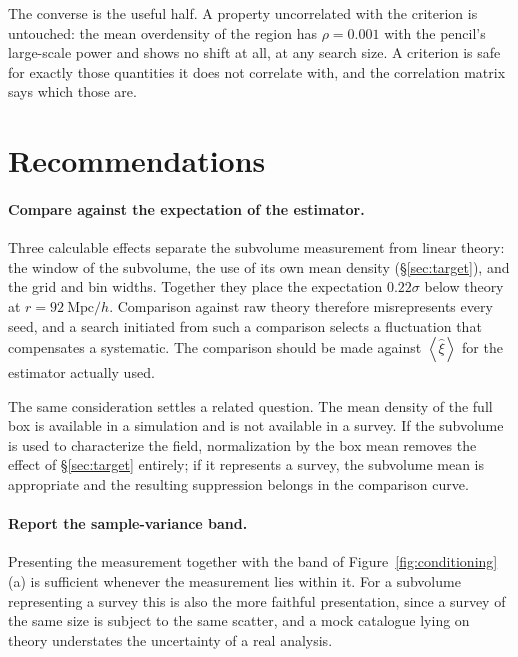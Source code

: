 \documentclass[12pt]{article}
\newcommand{\avg}[1]{\left\langle #1 \right\rangle}
\newcommand{\Mpch}{\ \mathrm{Mpc}/h}
\begin{document}
The converse is the useful half.  A property uncorrelated with the
criterion is untouched: the mean overdensity of the region has
$\rho = 0.001$ with the pencil's large-scale power and shows no shift at
all, at any search size.  A criterion is safe for exactly those
quantities it does not correlate with, and the correlation matrix says
which those are.

\section{Recommendations}\label{sec:recommendations}

\paragraph{Compare against the expectation of the estimator.}  Three
calculable effects separate the subvolume measurement from linear theory: the
window of the subvolume, the use of its own mean density (\S\ref{sec:target}),
and the grid and bin widths.  Together they place the expectation $0.22\sigma$
below theory at $r = 92\Mpch$.  Comparison against raw theory therefore
misrepresents every seed, and a search initiated from such a comparison selects
a fluctuation that compensates a systematic.  The comparison should be made
against $\avg{\hat\xi}$ for the estimator actually used.

The same consideration settles a related question.  The mean density of the
full box is available in a simulation and is not available in a survey.  If the
subvolume is used to characterize the field, normalization by the box mean
removes the effect of \S\ref{sec:target} entirely; if it represents a survey,
the subvolume mean is appropriate and the resulting suppression belongs in the
comparison curve.

\paragraph{Report the sample-variance band.}  Presenting the measurement
together with the band of Figure~\ref{fig:conditioning}(a) is sufficient
whenever the measurement lies within it.  For a subvolume representing a survey
this is also the more faithful presentation, since a survey of the same size is
subject to the same scatter, and a mock catalogue lying on theory understates
the uncertainty of a real analysis.
\end{document}
